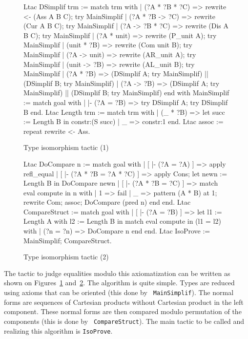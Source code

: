 \begin{figure}[ht]
\begin{centerframe}
\begin{coq_example}
Ltac DSimplif trm :=
  match trm with
  | (?A * ?B * ?C) =>
      rewrite <- (Ass A B C); try MainSimplif
  | (?A * ?B -> ?C) =>
      rewrite (Cur A B C); try MainSimplif
  | (?A -> ?B * ?C) =>
      rewrite (Dis A B C); try MainSimplif
  | (?A * unit) =>
      rewrite (P_unit A); try MainSimplif
  | (unit * ?B) =>
      rewrite (Com unit B); try MainSimplif
  | (?A -> unit) =>
      rewrite (AR_unit A); try MainSimplif
  | (unit -> ?B) =>
      rewrite (AL_unit B); try MainSimplif
  | (?A * ?B) =>
      (DSimplif A; try MainSimplif) || (DSimplif B; try MainSimplif)
  | (?A -> ?B) =>
      (DSimplif A; try MainSimplif) || (DSimplif B; try MainSimplif)
  end
 with MainSimplif :=
  match goal with
  | |- (?A = ?B) => try DSimplif A; try DSimplif B
  end.
Ltac Length trm :=
  match trm with
  | (_ * ?B) => let succ := Length B in constr:(S succ)
  | _ => constr:1
  end.
Ltac assoc := repeat rewrite <- Ass.
\end{coq_example}
\end{centerframe}
\caption{Type isomorphism tactic (1)}
\label{isosltac1}
\end{figure}

\begin{figure}[ht]
\begin{centerframe}
\begin{coq_example}
Ltac DoCompare n :=
  match goal with
  | [ |- (?A = ?A) ] => apply refl_equal
  | [ |- (?A * ?B = ?A * ?C) ] =>
      apply Cons; let newn := Length B in
                  DoCompare newn
  | [ |- (?A * ?B = ?C) ] =>
      match eval compute in n with
      | 1 => fail
      | _ =>
          pattern (A * B) at 1; rewrite Com; assoc; DoCompare (pred n)
      end
  end.
Ltac CompareStruct :=
  match goal with
  | [ |- (?A = ?B) ] =>
      let l1 := Length A
      with l2 := Length B in
      match eval compute in (l1 = l2) with
      | (?n = ?n) => DoCompare n
      end
  end.
Ltac IsoProve := MainSimplif; CompareStruct.
\end{coq_example}
\end{centerframe}
\caption{Type isomorphism tactic (2)}
\label{isosltac2}
\end{figure}

The tactic to judge equalities modulo this axiomatization can be written as
shown on Figures~\ref{isosltac1} and~\ref{isosltac2}. The algorithm is quite
simple. Types are reduced using axioms that can be oriented (this done by {\tt
MainSimplif}). The normal forms are sequences of Cartesian
products without Cartesian product in the left component. These normal forms
are then compared modulo permutation of the components (this is done by {\tt
CompareStruct}). The main tactic to be called and realizing this algorithm is
{\tt IsoProve}.

